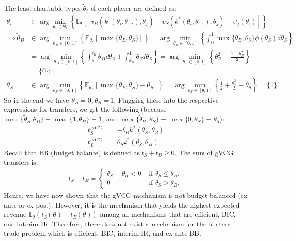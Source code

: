 \documentclass[a4paper]{article}
\begin{document}
	The least charitable types $\tilde{\theta}_i$ of each player are defined as:
	\begin{align*}
		\tilde{\theta}_i &\in \arg \min_{\theta_i \in \Theta_i} \left\{ \mathbb{E}_{\theta_{-i}} \left[ v_B (k^*(\theta_i,\theta_{-i}),\theta_j) + v_S (k^*(\theta_i,\theta_{-i}),\theta_j) - \underline{U}_i (\theta_i) \right] \right\}
		\\
		\Rightarrow \tilde{\theta}_B &\in \arg \min_{\theta_B \in [0,1]} \left\{ \mathbb{E}_{\theta_S} \left[ \max\{\theta_B,\theta_S\} \right] \right\} 
		= \arg \min_{\theta_B \in [0,1]} \left\{ \int_0^1 \max\{\theta_B,\theta_S\} \phi(\theta_S) d\theta_S \right\}
		\\
		&= \arg \min_{\theta_B \in [0,1]} \left\{ \int_0^{\theta_B} \theta_B d\theta_S + \int_{\theta_B}^1 \theta_S d\theta_S \right\}
		= \arg \min_{\theta_B \in [0,1]} \left\{ \theta_B^2 +  \frac{1-\theta_B^2}{2} \right\}	
		\\
		&= \{ 0 \};
		\\
		\tilde{\theta}_S &\in \arg \min_{\theta_S \in [0,1]} \left\{ \mathbb{E}_{\theta_B} \left[ \max\{\theta_B,\theta_S\} - \theta_S \right] \right\} = \arg \min_{\theta_S \in [0,1]} \left\{ \frac{1}{2} + \frac{\theta_S^2}{2} - \theta_S \right\} = \{1\}.
	\end{align*}
	So in the end we have $\tilde{\theta}_B = 0$, $\tilde{\theta}_S = 1$. Plugging these into the respective expressions for transfers, we get the following (because $\max\{\tilde{\theta}_S,\theta_B\} = \max\{1,\theta_B\} = 1$, and $\max\{\tilde{\theta}_B,\theta_S\} = \max\{0,\theta_S\} = \theta_S$):
	\begin{align*}
		t_S^{gVCG} &= - \theta_B k^*(\theta_S,\theta_B)
		\\
		t_B^{gVCG} &= \theta_S k^*(\theta_S,\theta_B)
	\end{align*}
	Recall that BB (budget balance) is defined as $t_S+t_B\geq0$. The sum of gVCG transfers is:
	\begin{align*}
		t_S+t_B= \begin{cases}
			\theta_S - \theta_B <0 & \text{ if } \theta_S \leq \theta_B, 
			\\ 
			0 & \text{ if } \theta_S > \theta_B.
		\end{cases}
	\end{align*}
	Hence, we have now shown that the gVCG mechanism is not budget balanced (ex ante or ex post). However, it is the mechanism that yields the highest expected revenue $\mathbb{E}_\theta \left(t_S(\theta) + t_B(\theta)\right)$ among all mechanisms that are efficient, BIC, and interim IR. Therefore, there does not exist a mechanism for the bilateral trade problem which is efficient, BIC, interim IR, and ex ante BB.
\end{document}
